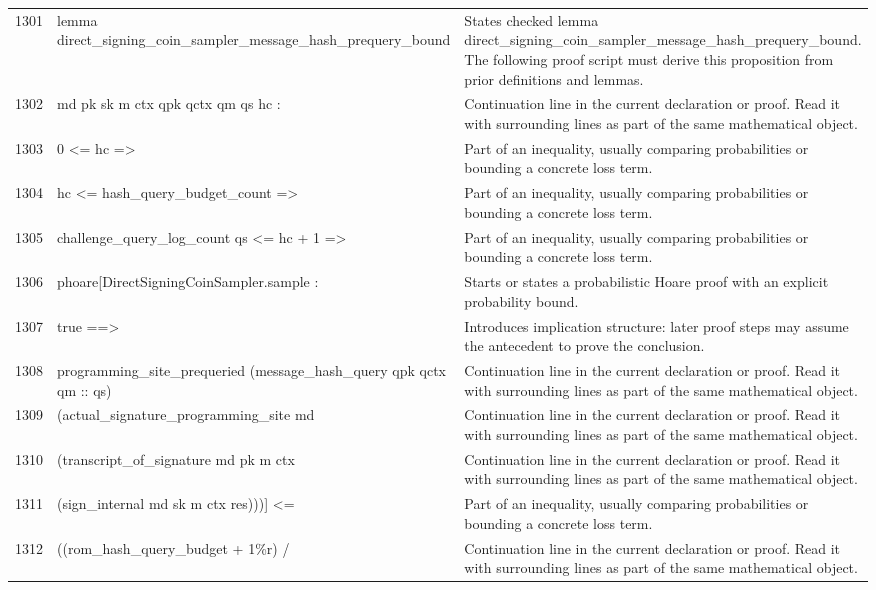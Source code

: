 \documentclass[10pt]{article}
\begin{document}
\begin{longtable}{r L{0.53\textwidth} L{0.37\textwidth}}
1301 & {\ttfamily\scriptsize lemma direct\_signing\_coin\_sampler\_message\_hash\_prequery\_bound} & States checked lemma direct\_signing\_coin\_sampler\_message\_hash\_prequery\_bound.  The following proof script must derive this proposition from prior definitions and lemmas. \\
1302 & {\ttfamily\scriptsize   md pk sk m ctx qpk qctx qm qs hc :} & Continuation line in the current declaration or proof.  Read it with surrounding lines as part of the same mathematical object. \\
1303 & {\ttfamily\scriptsize   0 <= hc =>} & Part of an inequality, usually comparing probabilities or bounding a concrete loss term. \\
1304 & {\ttfamily\scriptsize   hc <= hash\_query\_budget\_count =>} & Part of an inequality, usually comparing probabilities or bounding a concrete loss term. \\
1305 & {\ttfamily\scriptsize   challenge\_query\_log\_count qs <= hc + 1 =>} & Part of an inequality, usually comparing probabilities or bounding a concrete loss term. \\
1306 & {\ttfamily\scriptsize   phoare[DirectSigningCoinSampler.sample :} & Starts or states a probabilistic Hoare proof with an explicit probability bound. \\
1307 & {\ttfamily\scriptsize     true ==>} & Introduces implication structure: later proof steps may assume the antecedent to prove the conclusion. \\
1308 & {\ttfamily\scriptsize     programming\_site\_prequeried (message\_hash\_query qpk qctx qm :: qs)} & Continuation line in the current declaration or proof.  Read it with surrounding lines as part of the same mathematical object. \\
1309 & {\ttfamily\scriptsize       (actual\_signature\_programming\_site md} & Continuation line in the current declaration or proof.  Read it with surrounding lines as part of the same mathematical object. \\
1310 & {\ttfamily\scriptsize         (transcript\_of\_signature md pk m ctx} & Continuation line in the current declaration or proof.  Read it with surrounding lines as part of the same mathematical object. \\
1311 & {\ttfamily\scriptsize           (sign\_internal md sk m ctx res)))] <=} & Part of an inequality, usually comparing probabilities or bounding a concrete loss term. \\
1312 & {\ttfamily\scriptsize 	  ((rom\_hash\_query\_budget + 1\%r) /} & Continuation line in the current declaration or proof.  Read it with surrounding lines as part of the same mathematical object. \\

\end{longtable}
\end{document}
